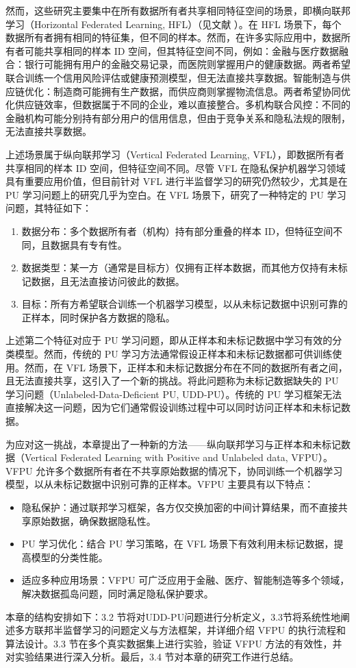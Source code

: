 然而，这些研究主要集中在所有数据所有者共享相同特征空间的场景，即横向联邦学习（Horizontal Federated Learning, HFL）（见文献 \citep{yang2019federated}）。在 HFL 场景下，每个数据所有者拥有相同的特征集，但不同的样本。然而，在许多实际应用中，数据所有者可能共享相同的样本 ID 空间，但其特征空间不同，例如：金融与医疗数据融合：银行可能拥有用户的金融交易记录，而医院则掌握用户的健康数据。两者希望联合训练一个信用风险评估或健康预测模型，但无法直接共享数据。智能制造与供应链优化：制造商可能拥有生产数据，而供应商则掌握物流信息。两者希望协同优化供应链效率，但数据属于不同的企业，难以直接整合。多机构联合风控：不同的金融机构可能分别持有部分用户的信用信息，但由于竞争关系和隐私法规的限制，无法直接共享数据。

上述场景属于纵向联邦学习（Vertical Federated Learning, VFL）\citep{yang2019federated}，即数据所有者共享相同的样本 ID 空间，但特征空间不同。尽管 VFL 在隐私保护机器学习领域具有重要应用价值，但目前针对 VFL 进行半监督学习的研究仍然较少，尤其是在 PU 学习问题上的研究几乎为空白。在 VFL 场景下，研究了一种特定的 PU 学习问题，其特征如下：
\begin{enumerate}
	\item 数据分布：多个数据所有者（机构）持有部分重叠的样本 ID，但特征空间不同，且数据具有专有性。
	\item 数据类型：某一方（通常是目标方）仅拥有正样本数据，而其他方仅持有未标记数据，且无法直接访问彼此的数据。
	\item 目标：所有方希望联合训练一个机器学习模型，以从未标记数据中识别可靠的正样本，同时保护各方数据的隐私。
\end{enumerate}

上述第二个特征对应于 PU 学习问题，即从正样本和未标记数据中学习有效的分类模型。然而，传统的 PU 学习方法\citep{mordelet2014bagging, liu2003building, liu2015classification, xu2017multi}通常假设正样本和未标记数据都可供训练使用。然而，在 VFL 场景下，正样本和未标记数据分布在不同的数据所有者之间，且无法直接共享，这引入了一个新的挑战。将此问题称为未标记数据缺失的 PU 学习问题（Unlabeled-Data-Deficient PU, UDD-PU）。传统的 PU 学习框架无法直接解决这一问题，因为它们通常假设训练过程中可以同时访问正样本和未标记数据。

为应对这一挑战，本章提出了一种新的方法——纵向联邦学习与正样本和未标记数据（Vertical Federated Learning with Positive and Unlabeled data, VFPU）。VFPU 允许多个数据所有者在不共享原始数据的情况下，协同训练一个机器学习模型，以从未标记数据中识别可靠的正样本。VFPU 主要具有以下特点：
\begin{itemize}
	\item 隐私保护：通过联邦学习框架，各方仅交换加密的中间计算结果，而不直接共享原始数据，确保数据隐私性。
	\item PU 学习优化：结合 PU 学习策略，在 VFL 场景下有效利用未标记数据，提高模型的分类性能。
	\item 适应多种应用场景：VFPU 可广泛应用于金融、医疗、智能制造等多个领域，解决数据孤岛问题，同时满足隐私保护要求。
\end{itemize}
本章的结构安排如下：3.2 节将对UDD-PU问题进行分析定义，3.3节将系统性地阐述多方联邦半监督学习的问题定义与方法框架，并详细介绍 VFPU 的执行流程和算法设计。3.3 节在多个真实数据集上进行实验，验证 VFPU 方法的有效性，并对实验结果进行深入分析。最后，3.4 节对本章的研究工作进行总结。




